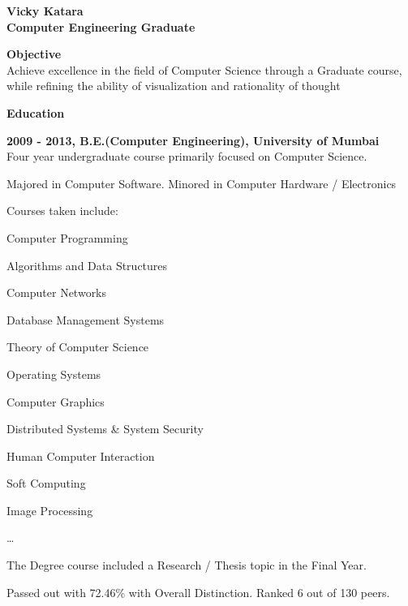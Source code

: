 \documentclass[a4paper,12pt,final]{memoir}
\newcommand{\Sep}{\vspace{1.5em}}
\newcommand{\SmallSep}{\vspace{0.5em}}
\newenvironment{Objective}
	{\ignorespaces\textbf{\color{Plum} Objective}}
	{\Sep\ignorespacesafterend}
\newcommand{\CVSection}[1]
	{\Large\textbf{#1}\par
	\SmallSep\normalsize\normalfont}
\newcommand{\CVItem}[1]
	{\textbf{\color{Plum} #1}}
\begin{document}
\Huge\bfseries {\color{Plum} Vicky Katara} \\
\Large\bfseries  Computer Engineering Graduate \\

\normalsize\normalfont

\begin{Objective}
\\Achieve excellence in the field of Computer Science through a Graduate course, while refining the \allowbreak ability of visualization and rationality of thought
\end{Objective}

\CVSection{Education}
\CVItem{2009 - 2013, B.E.(Computer Engineering), University of \allowbreak  Mumbai} \\
Four year undergraduate course primarily focused on Computer Science.
\SmallSep\\
{\footnotesize 
	\begin{minipage}{14cm}
		\begin{compactitem}[\color{Plum}$\circ$]
				\item Majored in Computer Software. Minored in Computer Hardware / Electronics
				\item Courses taken include:
					{\scriptsize 
							\begin{multicols}{2}
							\begin{compactitem}[\color{Plum}$\triangleright$]
									\item Computer Programming
									\item Algorithms and Data Structures
									\item Computer Networks
									\item Database Management Systems
									\item Theory of Computer Science
									\item Operating Systems 
									\item Computer Graphics
									\item Distributed Systems \& System Security
									\item Human Computer Interaction
									\item Soft Computing
									\item Image Processing
									\item \ldots
							\end{compactitem}
						\end{multicols}
					}
					\SmallSep
				\item The Degree course included a Research / Thesis topic in the Final Year.
				\item Passed out with 72.46\% with Overall Distinction. Ranked 6 out of 130 peers.
		\end{compactitem}
	\end{minipage}
	}
\SmallSep
\end{document}
